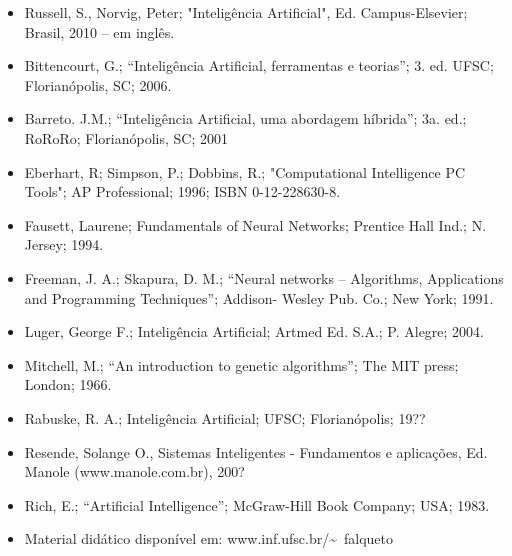 \begin{frame}[allowframebreaks=0.9]
\begin{itemize}
\item \scriptsize{Russell, S., Norvig, Peter; "Inteligência Artificial", Ed. Campus-Elsevier; Brasil, 2010  -- em inglês.}



\item \scriptsize{Bittencourt, G.; “Inteligência Artificial, ferramentas e teorias”; 3. ed. UFSC; Florianópolis, SC; 2006.}

\item \scriptsize{Barreto. J.M.; “Inteligência Artificial, uma abordagem híbrida”; 3a. ed.; RoRoRo; Florianópolis, SC; 2001}

\item \scriptsize{Eberhart, R; Simpson, P.; Dobbins, R.; "Computational Intelligence PC Tools"; AP Professional; 1996; ISBN 0-12-228630-8.}

\item \scriptsize{Fausett, Laurene; Fundamentals of Neural Networks; Prentice Hall Ind.; N. Jersey; 1994.}

\item \scriptsize{Freeman, J. A.; Skapura, D. M.; “Neural networks – Algorithms, Applications and Programming Techniques”; Addison- Wesley Pub. Co.; New York; 1991.}

\item \scriptsize{Luger, George F.; Inteligência Artificial; Artmed Ed. S.A.; P. Alegre; 2004.}

\item \scriptsize{Mitchell, M.; “An introduction to genetic algorithms”; The MIT press; London; 1966.}

\item \scriptsize{Rabuske, R. A.; Inteligência Artificial; UFSC; Florianópolis; 19??}

\item \scriptsize{Resende, Solange O., Sistemas Inteligentes - Fundamentos e aplicações, Ed. Manole (www.manole.com.br), 200?}

\item \scriptsize{Rich, E.; “Artificial Intelligence”; McGraw-Hill Book Company; USA; 1983.}
\item \scriptsize{Material didático disponível em: www.inf.ufsc.br/\~~falqueto}

\end{itemize}

\end{frame}




